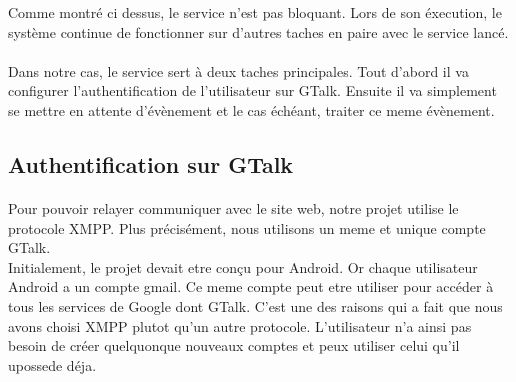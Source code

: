 Comme montré ci dessus, le service n'est pas  bloquant. Lors de son éxecution, le système continue de 
fonctionner sur d'autres taches en paire avec le service lancé.

\paragraph{}
Dans notre cas, le service sert à deux taches principales. Tout d'abord il va configurer l'authentification
de l'utilisateur sur GTalk. Ensuite il va simplement se mettre en attente d'évènement et le cas échéant, 
traiter ce meme évènement.




\subsection{Authentification sur GTalk}



\paragraph{}
Pour pouvoir relayer communiquer avec le site web, notre projet utilise le protocole XMPP. Plus 
précisément, nous utilisons un meme et unique compte GTalk. 
\\
Initialement, le projet devait etre conçu pour Android. Or chaque utilisateur Android a un compte 
gmail. Ce meme compte peut etre utiliser pour accéder à tous les services de Google dont GTalk.
C'est une des raisons qui a fait que nous avons choisi XMPP plutot qu'un autre protocole. L'utilisateur
n'a ainsi pas besoin de créer quelquonque nouveaux comptes et peux utiliser celui qu'il upossede déja.

